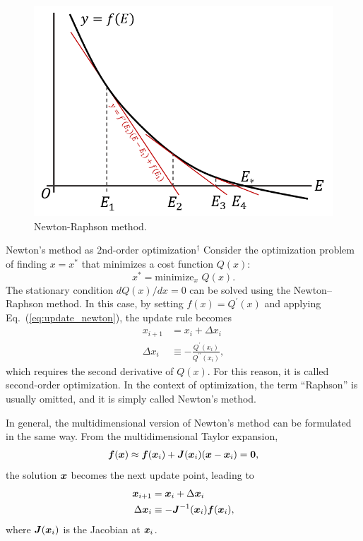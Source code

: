 \begin{figure}[]
 \begin{center}
 \includegraphics[width=1.0\linewidth]{fig/newton_raphthon.png}
\end{center}
	\caption{Newton-Raphson method.}
	\label{fig:newton_raphson}
\end{figure} 

\begin{itembox}{Newton's method as 2nd-order optimization$^\dagger$}
\footnotesize
\color{gray}
Consider the optimization problem of finding $x = x^\ast$ that minimizes a cost function $Q(x)$:
\begin{equation}
x^\ast = \mathrm{minimize}_{x} \,\, Q(x) .
\end{equation}
The stationary condition
$d Q(x)/d x = 0$
can be solved using the Newton–Raphson method. In this case, by setting
$f (x) = Q^\prime (x)$
and applying Eq.~(\ref{eq:update_newton}), the update rule becomes
\begin{align}
x_{i+1} &= x_i + \Delta x_i \\
\Delta x_i &\equiv - \frac{Q^\prime (x_i)}{Q^{\prime\prime}(x_i)} ,
\end{align}
which requires the second derivative of $Q(x)$. For this reason, it is called second-order optimization. In the context of optimization, the term ``Raphson'' is usually omitted, and it is simply called Newton's method.

In general, the multidimensional version of Newton's method can be formulated in the same way. From the multidimensional Taylor expansion,
\begin{align}
\boldsymbol{f}(\boldsymbol{x}) \approx \boldsymbol{f}(\boldsymbol{x}_i) + \boldsymbol{J} (\boldsymbol{x}_i) (\boldsymbol{x} - \boldsymbol{x}_i) = \boldsymbol{0},
\end{align}
the solution $\boldsymbol{x}$ becomes the next update point, leading to
\begin{align}
\boldsymbol{x}_{i+1} &= \boldsymbol{x}_{i} + \Delta \boldsymbol{x}_i \\
\label{eq:second_newton}
\Delta \boldsymbol{x}_i &\equiv - \boldsymbol{J}^{-1} (\boldsymbol{x}_i) \boldsymbol{f}(\boldsymbol{x}_i) ,
\end{align}
where $\boldsymbol{J} (\boldsymbol{x}_i)$ is the Jacobian at $\boldsymbol{x}_i$.
\end{itembox}

